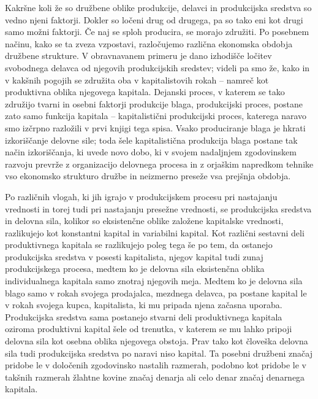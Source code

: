 \documentclass[kapital_02.tex]{subfiles}
\begin{document}
Kakršne koli že so družbene oblike produkcije, delavci in produkcijska sredstva so vedno njeni faktorji. Dokler so ločeni drug od drugega, pa so tako eni kot drugi samo možni faktorji. Če naj se sploh producira, se morajo združiti. Po posebnem načinu, kako se ta zveza vzpostavi, razločujemo različna ekonomska obdobja družbene strukture. V obravnavanem primeru je dano izhodišče ločitev svobodnega delavca od njegovih produkcijskih sredstev; videli pa smo že, kako in v kakšnih pogojih se združita oba v kapitalistovih rokah -- namreč kot produktivna oblika njegovega kapitala. Dejanski proces, v katerem se tako združijo tvarni in osebni faktorji produkcije blaga, produkcijski proces, postane zato samo funkcija kapitala -- kapitalistični produkcijski proces, katerega naravo smo izčrpno razložili v prvi knjigi tega spisa. Vsako produciranje blaga je hkrati izkoriščanje delovne sile; toda šele kapitalistična produkcija blaga postane tak način izkoriščanja, ki uvede novo dobo, ki v svojem nadaljnjem zgodovinskem razvoju prevrže z organizacijo delovnega procesa in z orjaškim napredkom tehnike vso ekonomsko strukturo družbe in neizmerno preseže vsa prejšnja obdobja.

Po različnih vlogah, ki jih igrajo v produkcijskem procesu pri nastajanju vrednosti in torej tudi pri nastajanju presežne vrednosti, se produkcijska sredstva in delovna sila, kolikor so eksistenčne oblike založene kapitalske vrednosti, razlikujejo kot konstantni kapital in variabilni kapital. Kot \KPEstran različni sestavni deli produktivnega kapitala se razlikujejo poleg tega še po tem, da ostanejo produkcijska sredstva v posesti kapitalista, njegov kapital tudi zunaj produkcijskega procesa, medtem ko je delovna sila eksistenčna oblika individualnega kapitala samo znotraj njegovih meja. Medtem ko je delovna sila blago samo v rokah svojega prodajalca, mezdnega delavca, pa postane kapital le v rokah svojega kupca, kapitalista, ki mu pripada njena začasna uporaba. Produkcijska sredstva sama postanejo stvarni deli produktivnega kapitala oziroma produktivni kapital šele od trenutka, v katerem se mu lahko pripoji delovna sila kot osebna oblika njegovega obstoja. Prav tako kot človeška delovna sila tudi produkcijska sredstva po naravi niso kapital. Ta posebni družbeni značaj pridobe le v določenih zgodovinsko nastalih razmerah, podobno kot pridobe le v takšnih razmerah žlahtne kovine značaj denarja ali celo denar značaj denarnega kapitala.
\end{document}
